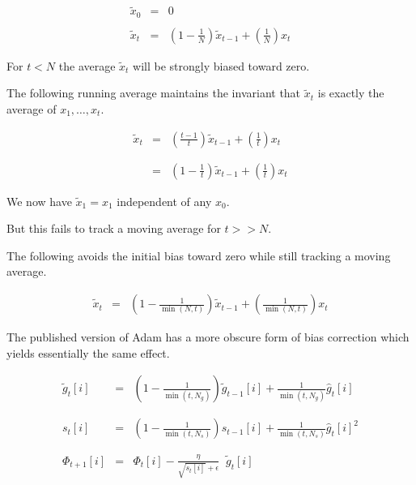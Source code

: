 {\begin{eqnarray*}
\tilde{x}_0 & = & 0 \\
\\
\tilde{x}_t & = & \left(1-\frac{1}{N}\right)\tilde{x}_{t-1} + \left(\frac{1}{N}\right)x_t
\end{eqnarray*}

\vfill
For $t < N$ the average $\tilde{x}_t$ will be strongly biased toward zero.


The following running average maintains the invariant that $\tilde{x}_t$ is exactly the average of $x_1,\ldots,x_t$.

\begin{eqnarray*}
\tilde{x}_t & = & \left(\frac{t-1}{t}\right)\tilde{x}_{t-1} + \left(\frac{1}{t}\right)x_t \\
\\
\\
& = & \left(1-\frac{1}{t}\right)\tilde{x}_{t-1} + \left(\frac{1}{t}\right)x_t
\end{eqnarray*}

\vfill
We now have $\tilde{x}_1 = x_1$ independent of any $x_0$.

\vfill
But this fails to track a moving average for $t >> N$.


The following avoids the initial bias toward zero while still tracking a moving average.

\begin{eqnarray*}
\tilde{x}_t & = & \left(1-\frac{1}{\min(N,t)}\right)\tilde{x}_{t-1} + \left(\frac{1}{\min(N,t)}\right)x_t
\end{eqnarray*}

\vfill
The published version of Adam has a more obscure form of bias correction which yields essentially the same effect.


\begin{eqnarray*}
  \tilde{g}_{t}[i] & = & \left(1-\frac{1}{\min(t,N_g)}\right)\tilde{g}_{t-1}[i] + \frac{1}{\min(t,N_g)} \hat{g}_t[i] \\
  \\
  \\
  s_{t}[i] & = & \left(1-\frac{1}{\min(t,N_s)}\right)s_{t-1}[i] + \frac{1}{\min(t,N_s)} \hat{g}_t[i]^2 \\
  \\
  \\
\Phi_{t+1}[i] & =  & \Phi_t[i] - \frac{\eta}{\sqrt{s_{t}[i]} + \epsilon}\;\;\tilde{g}_{t}[i]
\end{eqnarray*}

}
